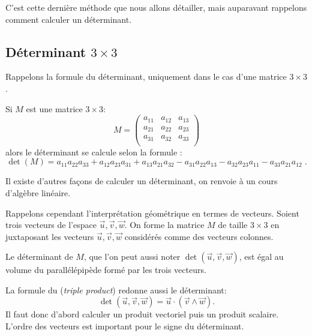 \documentclass[11pt,class=report,crop=false]{standalone}
\begin{document}
C'est cette dernière méthode que nous allons détailler, mais auparavant rappelons comment calculer un déterminant.



\subsection{Déterminant $3\times 3$}


Rappelons la formule du déterminant, uniquement dans le cas d'une matrice $3\times 3$.

Si $M$ est une matrice $3 \times 3$:
$$M = \begin{pmatrix}
	a_{11} & a_{12} & a_{13} \\
	a_{21} & a_{22} & a_{23} \\
	a_{31} & a_{32} & a_{33} \\
\end{pmatrix}$$
alors le déterminant se calcule selon la formule :
$$\det(M) =
a_{11} a_{22} a_{33}
+ a_{12} a_{23} a_{31}
+ a_{13} a_{21} a_{32}
- a_{31} a_{22} a_{13}
- a_{32} a_{23} a_{11}
- a_{33} a_{21} a_{12}\; .$$


Il existe d'autres façons de calculer un déterminant, on renvoie à un cours d'algèbre linéaire.

Rappelons cependant l'interprétation géométrique en termes de vecteurs.
Soient trois vecteurs de l'espace $\vec u, \vec v, \vec w$.
On forme la matrice $M$ de taille $3\times3$ en juxtaposant les vecteurs  $\vec u, \vec v, \vec w$ considérés comme des vecteurs colonnes. 

\begin{minipage}{0.45\textwidth}
\end{minipage}
\begin{minipage}{0.45\textwidth}
\end{minipage}

\smallskip

Le déterminant de $M$, que l'on peut aussi noter $\det(\vec u, \vec v, \vec w)$, est égal au volume du parallélépipède formé par les trois vecteurs.



La formule du  (\emph{triple product}) redonne aussi le déterminant:
$$\det(\vec u, \vec v, \vec w) = \vec u \cdot (\vec v \wedge \vec w).$$
Il faut donc d'abord calculer un produit vectoriel puis un produit scalaire. 
L'ordre des vecteurs est important pour le signe du déterminant.
\end{document}

